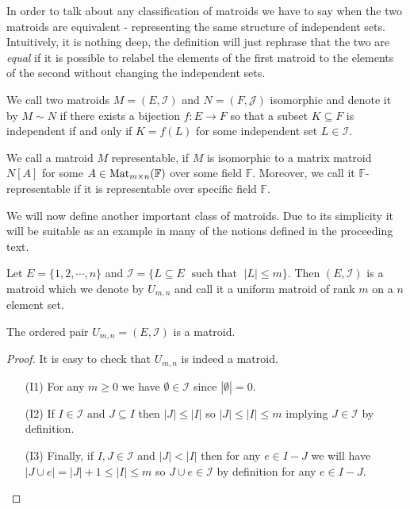 In order to talk about any classification of matroids we have to say when the two matroids are equivalent - representing the same structure of independent sets. Intuitively, it is nothing deep, the definition will just rephrase that the two are \textit{equal} if it is possible to relabel the elements of the first matroid to the elements of the second without changing the independent sets.

\begin{defn}
    We call two matroids $M = (E, \mathcal{I})$ and $N = (F, \mathcal{J})$ isomorphic and denote it by $M \sim N$ if there exists a bijection $f: E \to F$ so that a subset $K \subseteq F$ is independent if and only if $K = f(L)$ for some independent set $L \in \mathcal{I}$.
\end{defn}


\begin{defn}
    We call a matroid $M$ representable, if $M$ is isomorphic to a matrix matroid $N[A]$ for some $A \in \operatorname{Mat}_{m \times n}(\mathbb{F})$ over some field $\mathbb{F}$. Moreover, we  call it $\mathbb{F}$-representable if it is representable over specific field $\mathbb{F}$.
\end{defn}

We will now define another important class of matroids. Due to its simplicity it will be suitable as an example in many of the notions defined in the proceeding text.

\begin{defn}\label{uniformM}
    Let $E = \{1, 2, \cdots, n\}$ and $\mathcal{I} = \{ L \subseteq E \; \text{ such that } \; |L| \leq m\}$. Then $(E, \mathcal{I})$ is a matroid which we denote by $U_{m,n}$ and call it a uniform matroid of rank $m$ on a $n$ element set.
\end{defn}
\begin{theorem}
    The ordered pair $U_{m,n} = (E, \mathcal{I})$ is a matroid.
\end{theorem}

\begin{proof}
    
It is easy to check that $U_{m,n}$ is indeed a matroid. 

\begin{enumerate}
   

    \item[(I1)] For any $m \geq 0$ we have $\emptyset \in \mathcal{I}$ since $|\emptyset | = 0$.
    \item[(I2)] If $I \in \mathcal{I}$ and $J \subseteq I$ then $|J|\leq |I|$ so $|J|\leq |I| \leq m$ implying $J \in \mathcal{I}$ by definition.
    \item[(I3)] Finally, if $I, J \in \mathcal{I}$ and $|J|<|I|$ then for any $e \in I - J$ we will have $|J \cup e| = |J| + 1 \leq |I| \leq m$ so $J \cup e \in \mathcal{I}$ by definition for any $e \in I - J.$


\end{enumerate}
\end{proof}

